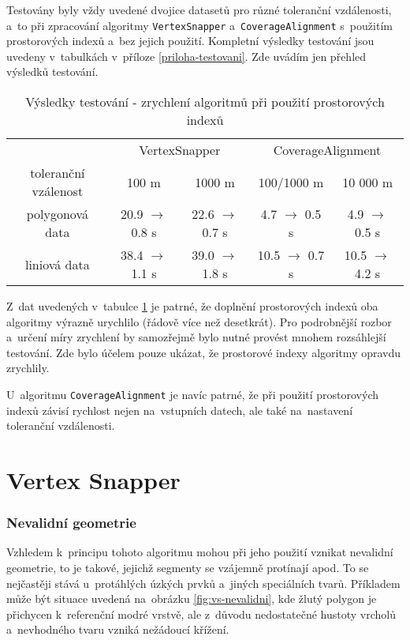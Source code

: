 Testovány byly vždy uvedené dvojice datasetů pro různé toleranční vzdálenosti,
a~to při zpracování algoritmy \texttt{Vertex\-Snapper} a~\texttt{Coverage\-Alignment}
s~použitím prostorových indexů a~bez jejich použití. Kompletní výsledky testování 
jsou uvedeny v~tabulkách v~příloze \ref{priloha-testovani}. Zde uvádím jen přehled 
výsledků testování.

\begin{table}[H]
 \centering
  \caption[Výsledky testování]{Výsledky testování - zrychlení algoritmů 
	  při použití prostorových indexů}
\begin{tabular}{|c|cc|cc|}
\hline
  & \multicolumn{2}{|c}{VertexSnapper} & \multicolumn{2}{|c|}{CoverageAlignment} \\
 toleranční vzálenost & 100 m & 1000 m & 100/1000 m & 10 000 m \\
\hline
\hline
 polygonová data & 20.9 $\rightarrow$ 0.8 s& 22.6 $\rightarrow$ 0.7 s& 
 4.7 $\rightarrow$ 0.5 s& 4.9 $\rightarrow$ 0.5 s\\
 liniová data & 38.4 $\rightarrow$ 1.1 s& 39.0 $\rightarrow$ 1.8 s& 
 10.5 $\rightarrow$ 0.7 s& 10.5 $\rightarrow$ 4.2 s\\
\hline
\end{tabular}
  \label{tab:vysledky}
\end{table}


Z~dat uvedených v~tabulce \ref{tab:vysledky} je patrné, že doplnění 
prostorových indexů oba algoritmy výrazně urychlilo (řádově více než 
desetkrát). Pro podrobnější rozbor a~určení míry zrychlení by 
samozřejmě bylo nutné provést mnohem rozsáhlejší tes\-tování. Zde bylo 
účelem pouze ukázat, že prostorové indexy algoritmy opravdu zrychlily.

U~algoritmu \texttt{Coverage\-Alignment} je navíc patrné,
že při použití prostorových indexů závisí rychlost nejen
na~vstupních datech, ale také na~nastavení toleranční 
vzdálenosti.

\section{Vertex Snapper}
\label{problemy-vs}

\subsubsection{Nevalidní geometrie}
Vzhledem k~principu tohoto algoritmu mohou při jeho použití vznikat nevalidní 
geometrie, to je takové, jejichž segmenty se vzájemně protínají apod. 
To se nejčastěji stává u~protáhlých úzkých prvků a~jiných speciálních tvarů. 
Příkladem může být situace uvedená na~obrázku \ref{fig:vs-nevalidni}, 
kde žlutý polygon je přichycen k~referenční modré vrstvě, ale z~důvodu 
nedostatečné hustoty vrcholů a~nevhodného tvaru vzniká nežádoucí křížení.

